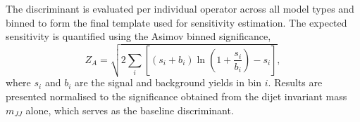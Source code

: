 The discriminant is evaluated per individual operator across all model types and binned to form the final template used for sensitivity estimation. The expected sensitivity is quantified using the Asimov binned significance,
\begin{equation}
Z_A = \sqrt{2\sum_i\left[(s_i + b_i)\ln\left(1 + \frac{s_i}{b_i}\right) - s_i\right]},
\end{equation}
where $s_i$ and $b_i$ are the signal and background yields in bin $i$. Results are presented normalised to the significance obtained from the dijet invariant mass $m_{JJ}$ alone, which serves as the baseline discriminant.